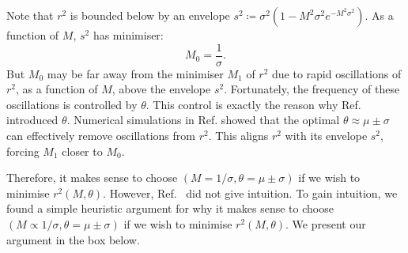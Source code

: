 \documentclass[twocolumn,
 reprint,
 amsmath,amssymb,
 aps,
 floatfix,
superscriptaddress
]{revtex4-1}
\begin{document}
Note that $r^{2}$ is bounded below by an envelope $s^{2}\coloneqq \sigma^{2}(1-M^{2}\sigma^{2}e^{-M^{2}\sigma^{2}})$. As a function of $M$, $s^2$ has minimiser:
\begin{equation}\label{eq:10}
M_0=\frac{1}{\sigma}.
\end{equation}
But $M_0$ may be far away from the minimiser $M_1$ of $r^{2}$
due to rapid oscillations of $r^{2}$, as a function of $M$, above the envelope $s^2$. Fortunately, the frequency of these oscillations is controlled by $\theta$. This control is exactly the reason why Ref.~\cite{Wiebe2014} introduced $\theta$. Numerical simulations in Ref. \cite[Appendix C]{Wiebe2014} showed that the optimal $\theta\approx\mu\pm\sigma$ can effectively remove oscillations from $r^2$. This aligns $r^2$ with its envelope $s^2$, forcing $M_1$ closer to $M_0$. 

Therefore, it makes sense to choose $(M=1/\sigma,\theta=\mu\pm\sigma)$ if we wish to minimise $r^2(M,\theta)$. However, Ref.~\cite{Wiebe2014} did not give intuition. To gain intuition, we found a simple heuristic argument for why it makes sense to choose $(M\propto 1/\sigma, \theta=\mu\pm\sigma)$ if we wish to minimise $r^2(M,\theta)$. We present our argument in the box below. 

\vspace{5 mm}
\end{document}
